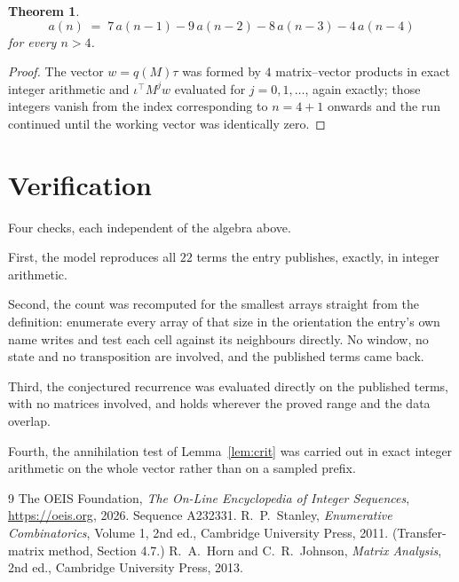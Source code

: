 \documentclass[11pt,a4paper]{article}
\theoremstyle{plain}
\newtheorem{theorem}{Theorem}
\theoremstyle{definition}
\begin{document}
\begin{theorem}
\[
a(n)\;=\;7\,a(n-1) - 9\,a(n-2) - 8\,a(n-3) - 4\,a(n-4)
\]
for every $n>4$.
\end{theorem}

\begin{proof}
The vector $w=q(M)\tau$ was formed by $4$ matrix--vector products in exact integer
arithmetic and $\iota^{\!\top}M^{j}w$ evaluated for $j=0,1,\dots$, again exactly; those
integers vanish from the index corresponding to $n=4+1$ onwards and the run continued
until the working vector was identically zero.
\end{proof}

\section{Verification}

Four checks, each independent of the algebra above.

First, the model reproduces all $22$ terms the entry publishes, exactly, in integer
arithmetic.

Second, the count was recomputed for the smallest arrays straight from the definition:
enumerate every array of that size in the orientation the entry's own name writes and test each
cell against its neighbours directly. No window, no state and no transposition are involved,
and the published terms came back.

Third, the conjectured recurrence was evaluated directly on the published terms, with no
matrices involved, and holds wherever the proved range and the data overlap.

Fourth, the annihilation test of Lemma~\ref{lem:crit} was carried out in exact integer
arithmetic on the whole vector rather than on a sampled prefix.

\begin{thebibliography}{9}
 The OEIS Foundation, \emph{The On-Line Encyclopedia of Integer
Sequences}, \url{https://oeis.org}, 2026. Sequence A232331.
 R.~P.~Stanley, \emph{Enumerative Combinatorics}, Volume 1, 2nd ed.,
Cambridge University Press, 2011. (Transfer-matrix method, Section 4.7.)
 R.~A.~Horn and C.~R.~Johnson, \emph{Matrix Analysis}, 2nd ed., Cambridge
University Press, 2013.
\end{thebibliography}
\end{document}
